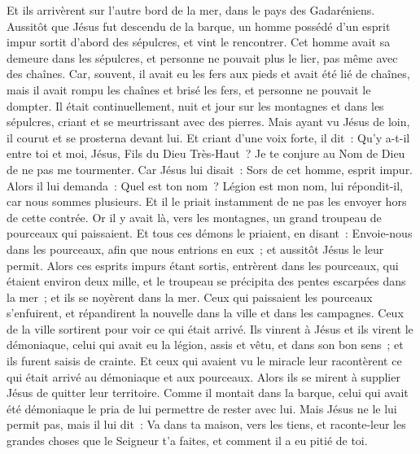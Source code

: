 \begin{multicols}{2}
\VerseOne{}Et ils arrivèrent sur l'autre bord de la mer, dans le pays des Gadaréniens.
Aussitôt que Jésus fut descendu de la barque, un homme possédé d'un esprit impur sortit d'abord des sépulcres, et vint le rencontrer.
Cet homme avait sa demeure dans les sépulcres, et personne ne pouvait plus le lier, pas même avec des chaînes.
Car, souvent, il avait eu les fers aux pieds et avait été lié de chaînes, mais il avait rompu les chaînes et brisé les fers, et personne ne pouvait le dompter.
Il était continuellement, nuit et jour sur les montagnes et dans les sépulcres, criant et se meurtrissant avec des pierres.
Mais ayant vu Jésus de loin, il courut et se prosterna devant lui.
Et criant d'une voix forte, il dit~: Qu'y a-t-il entre toi et moi, Jésus, Fils du Dieu Très-Haut~? Je te conjure au Nom de Dieu de ne pas me tourmenter.
Car Jésus lui disait~: Sors de cet homme, esprit impur.
Alors il lui demanda~: Quel est ton nom~? Légion est mon nom, lui répondit-il, car nous sommes plusieurs.
Et il le priait instamment de ne pas les envoyer hors de cette contrée.
Or il y avait là, vers les montagnes, un grand troupeau de pourceaux qui paissaient.
Et tous ces démons le priaient, en disant~: Envoie-nous dans les pourceaux, afin que nous entrions en eux~;
et aussitôt Jésus le leur permit. Alors ces esprits impurs étant sortis, entrèrent dans les pourceaux, qui étaient environ deux mille, et le troupeau se précipita des pentes escarpées dans la mer~; et ils se noyèrent dans la mer.
Ceux qui paissaient les pourceaux s'enfuirent, et répandirent la nouvelle dans la ville et dans les campagnes. Ceux de la ville sortirent pour voir ce qui était arrivé.
Ils vinrent à Jésus et ils virent le démoniaque, celui qui avait eu la légion, assis et vêtu, et dans son bon sens~; et ils furent saisis de crainte.
Et ceux qui avaient vu le miracle leur racontèrent ce qui était arrivé au démoniaque et aux pourceaux.
Alors ils se mirent à supplier Jésus de quitter leur territoire.
Comme il montait dans la barque, celui qui avait été démoniaque le pria de lui permettre de rester avec lui.
Mais Jésus ne le lui permit pas, mais il lui dit~: Va dans ta maison, vers les tiens, et raconte-leur les grandes choses que le Seigneur t'a faites, et comment il a eu pitié de toi.

\end{multicols}
